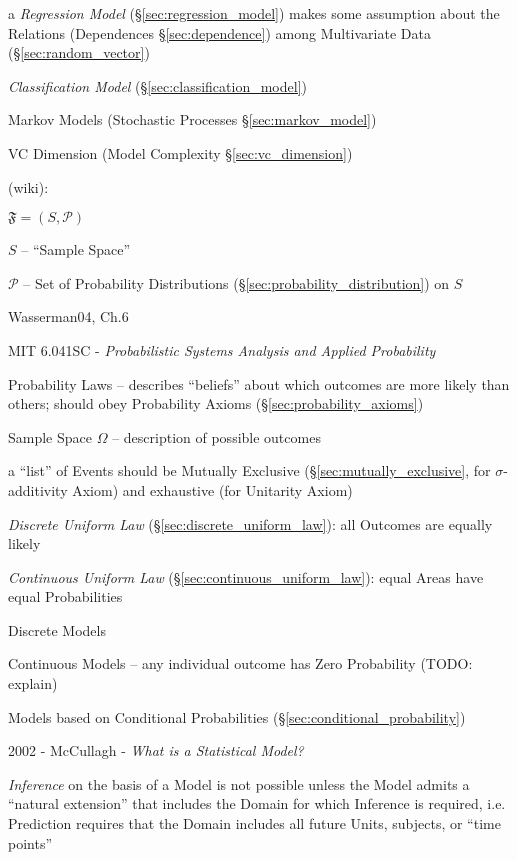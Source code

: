 \fist a \emph{Regression Model} (\S\ref{sec:regression_model}) makes some
assumption about the Relations (Dependences \S\ref{sec:dependence}) among
Multivariate Data (\S\ref{sec:random_vector})

\fist \emph{Classification Model} (\S\ref{sec:classification_model})

\fist Markov Models (Stochastic Processes \S\ref{sec:markov_model})

VC Dimension (Model Complexity \S\ref{sec:vc_dimension})

(wiki):

$\mathfrak{F} = (S, \mathcal{P})$

$S$ -- ``Sample Space''

$\mathcal{P}$ -- Set of Probability Distributions
(\S\ref{sec:probability_distribution}) on $S$

Wasserman04, Ch.6

\asterism

MIT 6.041SC - \emph{Probabilistic Systems Analysis and Applied Probability}

Probability Laws -- describes ``beliefs'' about which outcomes are more likely
than others; should obey Probability Axioms (\S\ref{sec:probability_axioms})

Sample Space $\Omega$ -- description of possible outcomes

a ``list'' of Events should be Mutually Exclusive
(\S\ref{sec:mutually_exclusive}, for $\sigma$-additivity Axiom) and exhaustive
(for Unitarity Axiom)

\emph{Discrete Uniform Law} (\S\ref{sec:discrete_uniform_law}): all Outcomes are
equally likely

\emph{Continuous Uniform Law} (\S\ref{sec:continuous_uniform_law}): equal Areas
have equal Probabilities

Discrete Models

Continuous Models -- any individual outcome has Zero Probability (TODO: explain)

Models based on Conditional Probabilities (\S\ref{sec:conditional_probability})

\asterism

2002 - McCullagh - \emph{What is a Statistical Model?}

\emph{Inference} on the basis of a Model is not possible unless the Model admits
a ``natural extension'' that includes the Domain for which Inference is
required, i.e. Prediction requires that the Domain includes all future Units,
subjects, or ``time points''

